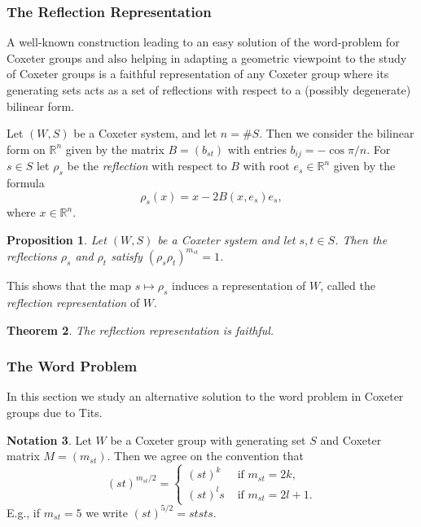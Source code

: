 \documentclass[a4paper]{article}
\newtheorem{theorem}{Theorem}[section]
\newtheorem{proposition}[theorem]{Proposition}
\theoremstyle{definition}
\newtheorem{notation}[theorem]{Notation}
\begin{document}
\subsubsection{The Reflection Representation}
A well-known construction leading to an easy solution of the word-problem for Coxeter groups and also helping in adapting a geometric viewpoint to the study of Coxeter groups is a faithful representation of any Coxeter group where its generating sets acts as a set of reflections with respect to a (possibly degenerate) bilinear form.

Let $(W,S)$ be a Coxeter system, and let $n = \#S$. Then we consider the bilinear form on $\mathbb{R}^n$ given by the matrix $B = (b_{st})$ with entries $b_{ij} = -\cos \pi/n$. 
For $s \in S$ let $\rho_s$ be the \textit{reflection} with respect to $B$ with root $e_s \in \mathbb{R}^n$ given by the formula
$$ \rho_s(x) = x - 2B(x, e_s)e_s,$$
where $x \in \mathbb{R}^n$.

\begin{proposition}
Let $(W,S)$ be a Coxeter system and let $s, t \in S$. Then the reflections $\rho_s$ and $\rho_t$ satisfy $(\rho_s \rho_t)^{m_{st}} = 1$.
\end{proposition}


This shows that the map $s \mapsto \rho_s$ induces a representation of $W$, called the \textit{reflection representation} of $W$.

\begin{theorem}
The reflection representation is faithful.
\end{theorem}

\subsubsection{The Word Problem}
In this section we study an alternative solution to the word problem in Coxeter groups due to Tits. %
\begin{notation}
Let $W$ be a Coxeter group with generating set $S$ and Coxeter matrix $M = (m_{st})$. Then we agree on the convention that
$$(st)^{m_{st}/2} =  \begin{cases}
(st)^k & \text{ if } m_{st} = 2k, \\
(st)^ls & \text{ if } m_{st} = 2l + 1.
\end{cases}$$
E.g., if $m_{st}=5$ we write $(st)^{5/2} = ststs$. 
\end{notation}
\end{document}

